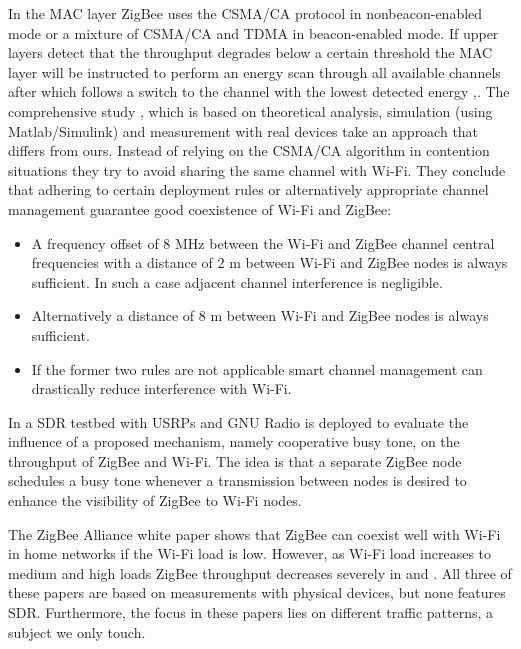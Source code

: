 In the MAC layer ZigBee uses the CSMA/CA protocol in nonbeacon-enabled mode or a mixture of CSMA/CA and TDMA in beacon-enabled mode. If upper layers detect that the throughput degrades below a certain threshold the MAC layer will be instructed to perform an energy scan through all available channels after which follows a switch to the channel with the lowest detected energy \cite{yi11},\cite{zhang11}. 
The comprehensive study \cite{yi11}, which is based on theoretical analysis, simulation (using Matlab/Simulink) and measurement with real devices take an approach that differs from ours. Instead of relying on the CSMA/CA algorithm in contention situations they try to avoid sharing the same channel with Wi-Fi. They conclude that adhering to certain deployment rules or alternatively appropriate channel management guarantee good coexistence of Wi-Fi and ZigBee:
\begin{itemize}
	\item A frequency offset of 8 MHz between the Wi-Fi and ZigBee channel central frequencies with a distance of 2 m between Wi-Fi and ZigBee nodes is always sufficient. In such a case adjacent channel interference is negligible.
	\item Alternatively a distance of 8 m between Wi-Fi and ZigBee nodes is always sufficient.
	\item If the former two rules are not applicable smart channel management can drastically reduce interference with Wi-Fi.
\end{itemize}

In \cite{zhang11} a SDR testbed with USRPs and GNU Radio is deployed to evaluate the influence of a proposed mechanism, namely cooperative busy tone, on the throughput of ZigBee and Wi-Fi. The idea is that a separate ZigBee node schedules a busy tone whenever a transmission between nodes is desired to enhance the visibility of ZigBee to Wi-Fi nodes. 

The ZigBee Alliance white paper \cite{thonet08} shows that ZigBee can coexist well with Wi-Fi in home networks if the Wi-Fi load is low. However, as Wi-Fi load increases to medium and high loads ZigBee throughput decreases severely in \cite{gummadi09} and \cite{polin08}. All three of these papers are based on measurements with physical devices, but none features SDR. Furthermore, the focus in these papers lies on different traffic patterns, a subject we only touch.

